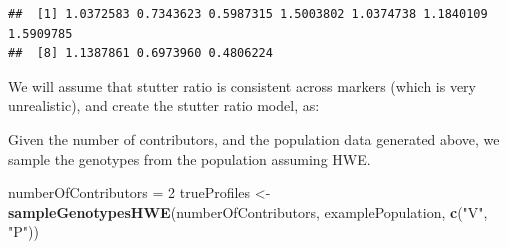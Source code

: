\documentclass[]{article}
\newenvironment{Shaded}{\begin{snugshade}}{\end{snugshade}}
\newcommand{\KeywordTok}[1]{\textcolor[rgb]{0.13,0.29,0.53}{\textbf{#1}}}
\newcommand{\DataTypeTok}[1]{\textcolor[rgb]{0.13,0.29,0.53}{#1}}
\newcommand{\DecValTok}[1]{\textcolor[rgb]{0.00,0.00,0.81}{#1}}
\newcommand{\FloatTok}[1]{\textcolor[rgb]{0.00,0.00,0.81}{#1}}
\newcommand{\StringTok}[1]{\textcolor[rgb]{0.31,0.60,0.02}{#1}}
\newcommand{\OperatorTok}[1]{\textcolor[rgb]{0.81,0.36,0.00}{\textbf{#1}}}
\newcommand{\NormalTok}[1]{#1}
\begin{document}
\begin{verbatim}
##  [1] 1.0372583 0.7343623 0.5987315 1.5003802 1.0374738 1.1840109 1.5909785
##  [8] 1.1387861 0.6973960 0.4806224
\end{verbatim}

We will assume that stutter ratio is consistent across markers (which is
very unrealistic), and create the stutter ratio model, as:

\begin{Shaded}
\end{Shaded}

Given the number of contributors, and the population data generated
above, we sample the genotypes from the population assuming HWE.

\begin{Shaded}
\begin{Highlighting}[]
\NormalTok{numberOfContributors =}\StringTok{ }\DecValTok{2}
\NormalTok{trueProfiles <-}\StringTok{ }\KeywordTok{sampleGenotypesHWE}\NormalTok{(numberOfContributors, examplePopulation, }\KeywordTok{c}\NormalTok{(}\StringTok{"V"}\NormalTok{, }\StringTok{"P"}\NormalTok{))}
\end{Highlighting}
\end{Shaded}
\end{document}

